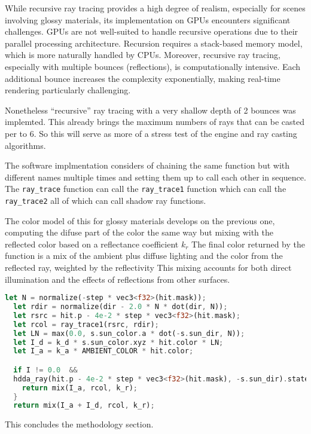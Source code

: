While recursive ray tracing provides a high degree of realism, especially for scenes involving glossy materials, its implementation on GPUs encounters significant challenges. GPUs are not well-suited to handle recursive operations due to their parallel processing architecture. Recursion requires a stack-based memory model, which is more naturally handled by CPUs. Moreover, recursive ray tracing, especially with multiple bounces (reflections), is computationally intensive. Each additional bounce increases the complexity exponentially, making real-time rendering particularly challenging.

Nonetheless ``recursive'' ray tracing with a very shallow depth of 2 bounces was implemted. This already brings the maximum numbers of rays that can be casted per to 6.
So this will serve as more of a stress test of the engine and ray casting algorithms.

The software implmentation considers of chaining the same function but with different names multiple times and setting them up to call each other in sequence.
The \texttt{ray\_trace} function can call the \texttt{ray\_trace1} function which can call the \texttt{ray\_trace2} all of which can call shadow ray functions.

The color model of this for glossy materials develops on the previous one, computing the difuse part of the color the same way but mixing with the reflected color based on a reflectance coefficient $k_{r}$
The final color returned by the function is a mix of the ambient plus diffuse lighting and the color from the reflected ray, weighted by the reflectivity
This mixing accounts for both direct illumination and the effects of reflections from other surfaces.

\begin{lstlisting}[language=rust,caption={Glossy materials color model}, captionpos=b]
  let N = normalize(-step * vec3<f32>(hit.mask));
  let rdir = normalize(dir - 2.0 * N * dot(dir, N));
  let rsrc = hit.p - 4e-2 * step * vec3<f32>(hit.mask);
  let rcol = ray_trace1(rsrc, rdir);
  let LN = max(0.0, s.sun_color.a * dot(-s.sun_dir, N));
  let I_d = k_d * s.sun_color.xyz * hit.color * LN;
  let I_a = k_a * AMBIENT_COLOR * hit.color;

  if I != 0.0  &&
  hdda_ray(hit.p - 4e-2 * step * vec3<f32>(hit.mask), -s.sun_dir).state == 0u {
    return mix(I_a, rcol, k_r);
  }
  return mix(I_a + I_d, rcol, k_r);
\end{lstlisting}

This concludes the methodology section.
